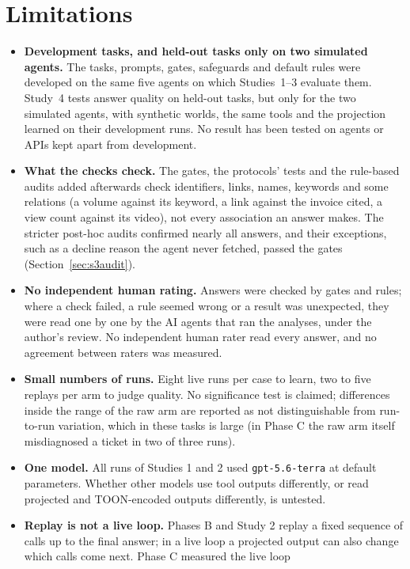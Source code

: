 \section{Limitations}
\label{sec:limitations}

\begin{itemize}
\item \textbf{Development tasks, and held-out tasks only on two simulated agents.} The tasks, prompts, gates,
safeguards and default rules were developed on the same five agents on which Studies~1--3 evaluate them. Study~4
tests answer quality on held-out tasks, but only for the two simulated agents, with synthetic worlds, the same
tools and the projection learned on their development runs. No result has been tested on agents or APIs kept apart
from development.
\item \textbf{What the checks check.} The gates, the protocols' tests and the rule-based audits added afterwards
check identifiers, links, names, keywords and some relations (a volume against its keyword, a link against the
invoice cited, a view count against its video), not every association an answer makes. The stricter post-hoc audits confirmed nearly all answers, and their
exceptions, such as a decline reason the agent never fetched, passed the gates (Section~\ref{sec:s3audit}).
\item \textbf{No independent human rating.} Answers were checked by gates and rules; where a check failed, a rule
seemed wrong or a result was unexpected, they were read one by one by the AI agents that ran the analyses, under the
author's review. No independent human rater read every answer, and no agreement between raters was measured.
\item \textbf{Small numbers of runs.} Eight live runs per case to learn, two to five replays per arm to judge
  quality. No significance test is claimed; differences inside the range of the raw arm are reported as not
  distinguishable from run-to-run variation, which in these tasks is large (in Phase C the raw arm itself
  misdiagnosed a ticket in two of three runs).
\item \textbf{One model.} All runs of Studies 1 and 2 used \texttt{gpt-5.6-terra} at default parameters. Whether other models use
  tool outputs differently, or read projected and TOON-encoded outputs differently, is untested.
\item \textbf{Replay is not a live loop.} Phases B and Study 2 replay a fixed sequence of calls up to the final
  answer; in a live loop a projected output can also change which calls come next. Phase C measured the live loop

\end{itemize}
